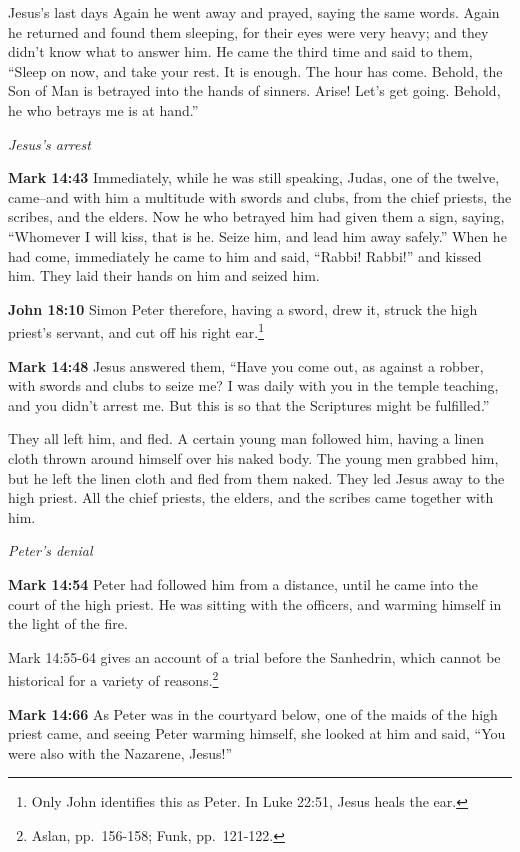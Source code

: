 \documentclass[10pt,twoside]{book}
\newcommand{\quotesize}{\normalsize{}}
\newcommand{\comm}[1]{\begingroup \color{black!50} #1\endgroup}
\newenvironment{quotetext}{\begingroup\quotesize}{\endgroup}
\newcommand{\bible}[2]{\begin{quotetext}\textbf{#1} #2\end{quotetext}}
\newcommand{\gospelmark}[2]{\bible{Mark #1}{#2}}
\newcommand{\john}[2]{\bible{John #1}{#2}}
\newcommand{\subhead}[1]{\emph{#1}\par}
\begin{document}
\begin{section}{Jesus's last days}
{  Again he went away and prayed, saying the same words.   Again he returned and found them sleeping, for their eyes were very heavy; and they didn't know what to answer him.   He came the third time and said to them, ``Sleep on now, and take your rest. It is enough. The hour has come. Behold, the Son of Man is betrayed into the hands of sinners.    Arise! Let's get going. Behold, he who betrays me is at hand.''
}

\subhead{Jesus's arrest}

\gospelmark{14:43}{
  Immediately, while he was still speaking, Judas, one of the twelve, came--and with him a multitude with swords and clubs, from the chief priests, the scribes, and the elders.   Now he who betrayed him had given them a sign, saying, ``Whomever I will kiss, that is he. Seize him, and lead him away safely.''   When he had come, immediately he came to him and said, ``Rabbi! Rabbi!'' and kissed him.   They laid their hands on him and seized him.}

\john{18:10}{
  Simon Peter therefore, having a sword, drew it, struck the high priest’s servant, and cut off his right ear.\footnote{Only John identifies this as Peter. In Luke 22:51, Jesus heals the ear.}
}

\gospelmark{14:48}{
  Jesus answered them, ``Have you come out, as against a robber, with swords and clubs to seize me?    I was daily with you in the temple teaching, and you didn't arrest me. But this is so that the Scriptures might be fulfilled.''

  They all left him, and fled.   A certain young man followed him, having a linen cloth thrown around himself over his naked body. The young men grabbed him,   but he left the linen cloth and fled from them naked.   They led Jesus away to the high priest. All the chief priests, the elders, and the scribes came together with him.
}

\subhead{Peter's denial}

\gospelmark{14:54}{
  Peter had followed him from a distance, until he came into the court of the high priest. He was sitting with the officers, and warming himself in the light of the fire.}

\comm{Mark 14:55-64 gives an account of a trial before the Sanhedrin, which cannot be historical for a variety of reasons.\footnote{Aslan, pp.~156-158;
Funk, pp.~121-122.}}

\gospelmark{14:66}{
  As Peter was in the courtyard below, one of the maids of the high priest came,   and seeing Peter warming himself, she looked at him and said, ``You were also with the Nazarene, Jesus!''

}
\end{section}
\end{document}
